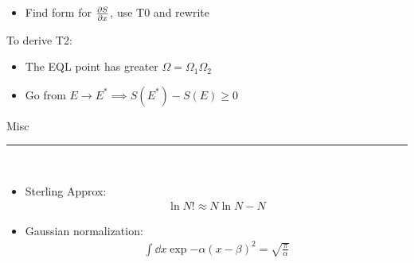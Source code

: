 \documentclass[8pt]{article}
\begin{document}
\begin{multicols*}{2}
\begin{itemize}
  \item Find form for $\pdv{S}{x}$, use T0 and rewrite 
  \end{itemize}
  To derive T2:
  \begin{itemize}
  \item The EQL point has greater $\Omega=\Omega_1\Omega_2$
  \item Go from $E\to E^*\implies S(E^*)-S(E)\geq0$
  \end{itemize}
  \begin{center}
    \large{Misc}
  \end{center}
  \hrule~\\
  \begin{itemize}
  \item Sterling Approx:
    \begin{gather*}
      \ln N!\approx N\ln N-N
    \end{gather*}
  \item Gaussian normalization:
  \begin{gather*}
    \int\dd{x}\exp{-\alpha(x-\beta)^2}=\sqrt{\frac{\pi}{\alpha}}
  \end{gather*}
\end{itemize}

\end{multicols*}
\end{document}
